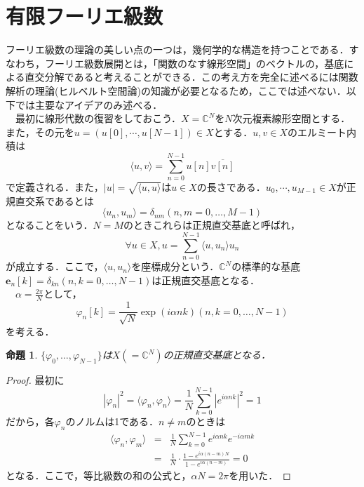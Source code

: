 \documentclass[a4j]{jsbook}
\newtheorem{prop}[theorem]{命題}
\numberwithin{theorem}{chapter}  %
\begin{document}
\section{有限フーリエ級数} \label{sec1-6}
フーリエ級数の理論の美しい点の一つは，幾何学的な構造を持つことである．すなわち，フーリエ級数展開とは，「関数のなす線形空間」のベクトルの，基底による直交分解であると考えることができる．この考え方を完全に述べるには関数解析の理論(ヒルベルト空間論)の知識が必要となるため，ここでは述べない．以下では主要なアイデアのみ述べる．\\
　最初に線形代数の復習をしておこう．\(X=\mathbb{C}^N\)を\(N\)次元複素線形空間とする．また，その元を\(u=(u[0], \cdots, u[N-1])\in X\)とする．\(u, v\in X\)のエルミート内積は
\begin{equation*}
    \langle u, v\rangle=\sum_{n=0}^{N-1} u[n]\overline{v[n]}
\end{equation*}
で定義される．また，\(|u|=\sqrt{\langle u, u\rangle}\)は\(u\in X\)の長さである．\(u_0, \cdots, u_{M-1}\in X\)が正規直交系であるとは
\begin{equation*}
    \langle u_n, u_m\rangle=\delta_{nm} (n, m=0, \dots, M-1)
\end{equation*}
となることをいう．\(N=M\)のときこれらは正規直交基底と呼ばれ，
\begin{equation*}
    \forall u\in X, u=\sum_{n=0}^{N-1}\langle u, u_n\rangle u_n
\end{equation*}
が成立する．ここで，\(\langle u, u_n\rangle\)を座標成分という．\(\mathbb{C}^N\)の標準的な基底\(\bm{e}_n[k]=\delta_{kn}(n, k=0, \dots, N-1)\)は正規直交基底となる．\\
　\(\displaystyle\alpha=\frac{2\pi}{N}\)として，
\begin{equation*}
    \varphi_n[k]=\frac{1}{\sqrt{N}}\exp(i\alpha nk) (n, k=0, \dots, N-1)
\end{equation*}
を考える．
\begin{prop}
\label{prop1-4}
\(\{\varphi_0, \dots, \varphi_{N-1}\}\)は\(X(=\mathbb{C}^N)\)の正規直交基底となる．
\end{prop}
\begin{proof}
最初に
\begin{equation*}
    |\varphi_n|^2=\langle\varphi_n, \varphi_n\rangle=\frac{1}{N}\sum_{k=0}^{N-1}\left|e^{i\alpha nk}\right|^2=1
\end{equation*}
だから，各\(\varphi_n\)のノルムは1である．\(n\neq m\)のときは
\begin{eqnarray*}
\langle\varphi_n, \varphi_m\rangle&=&\frac{1}{N}\sum_{k=0}^{N-1}e^{i\alpha nk}e^{-i\alpha mk} \\
&=&\frac{1}{N}\cdot\frac{1-e^{i\alpha(n-m)N}}{1-e^{i\alpha(n-m)}}=0
\end{eqnarray*}
となる．ここで，等比級数の和の公式と，\(\alpha N=2\pi\)を用いた．
\end{proof}
\end{document}
